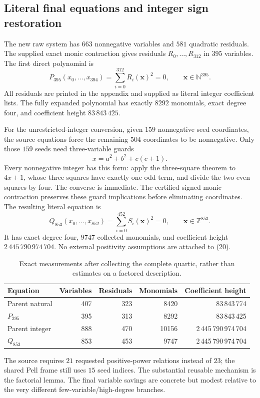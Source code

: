 \documentclass[11pt,letterpaper]{article}
\theoremstyle{definition}\newtheorem{definition}[theorem]{Definition}
\theoremstyle{remark}\newtheorem{remark}[theorem]{Remark}
\newcommand{\Z}{\mathbb Z}\newcommand{\N}{\mathbb N}\newcommand{\Q}{\mathbb Q}
\begin{document}
\subsection{Literal final equations and integer sign restoration}
The new raw system has $663$ nonnegative variables and $581$ quadratic residuals. The supplied exact monic contraction gives residuals $R_0,\ldots,R_{312}$ in $395$ variables. The first direct polynomial is
\[
 \boxed{P_{395}(x_0,\ldots,x_{394})=
 \sum_{i=0}^{312}R_i(\mathbf x)^2=0,
 \qquad \mathbf x\in\N^{395}.}
 \tag{19}\label{eq:P395}
\]
All residuals are printed in the appendix and supplied as literal integer coefficient lists. The fully expanded polynomial has exactly $8292$ monomials, exact degree four, and coefficient height $83\,843\,425$.

For the unrestricted-integer conversion, given $159$ nonnegative seed coordinates, the source equations force the remaining $504$ coordinates to be nonnegative. Only those $159$ seeds need three-variable guards
\[
 x=a^2+b^2+c(c+1).
\]
Every nonnegative integer has this form: apply the three-square theorem to $4x+1$, whose three squares have exactly one odd term, and divide the two even squares by four. The converse is immediate. The certified signed monic contraction preserves these guard implications before eliminating coordinates. The resulting literal equation is
\[
 \boxed{Q_{853}(x_0,\ldots,x_{852})=
 \sum_{i=0}^{452}S_i(\mathbf x)^2=0,
 \qquad \mathbf x\in\Z^{853}.}
 \tag{20}\label{eq:Q853}
\]
It has exact degree four, $9747$ collected monomials, and coefficient height $2\,445\,790\,974\,704$. No external positivity assumptions are attached to (20).

\begin{table}[ht]\centering\small
\begin{tabular}{lrrrr}\toprule
Equation&Variables&Residuals&Monomials&Coefficient height\\\midrule
Parent natural&407&323&8420&83\,843\,774\\
$P_{395}$&395&313&8292&83\,843\,425\\
Parent integer&888&470&10156&2\,445\,790\,974\,704\\
$Q_{853}$&853&453&9747&2\,445\,790\,974\,704\\\bottomrule
\end{tabular}
\caption{Exact measurements after collecting the complete quartic, rather than estimates on a factored description.}
\end{table}
The source requires $21$ requested positive-power relations instead of $23$; the shared Pell frame still uses $15$ seed indices. The substantial reusable mechanism is the factorial lemma. The final variable savings are concrete but modest relative to the very different few-variable/high-degree branches.
\end{document}
